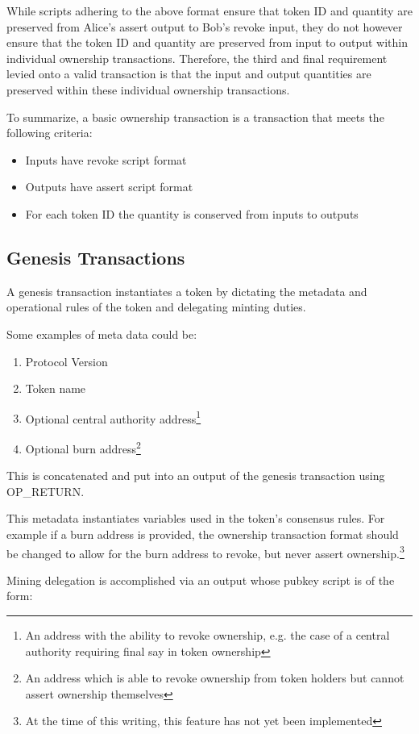 \documentclass[9pt,oneside]{amsart}
\begin{document}
While scripts adhering to the above format ensure that token ID and quantity are preserved from Alice's assert output to Bob's revoke input, they do not however ensure that the token ID and quantity are preserved from input to output within individual ownership transactions. Therefore, the third and final requirement levied onto a valid transaction is that the input and output quantities are preserved within these individual ownership transactions.

To summarize, a basic ownership transaction is a transaction that meets the following criteria:
\begin{itemize}
    \item Inputs have revoke script format
    \item Outputs have assert script format
    \item For each token ID the quantity is conserved from inputs to outputs
\end{itemize}

\subsection{Genesis Transactions}\label{subsec:gentrans}
A genesis transaction instantiates a token by dictating the metadata and operational rules of the token and delegating minting duties.

Some examples of meta data could be:
\begin{enumerate}
	\item Protocol Version
    \item Token name
	\item Optional central authority address\footnote{An address with the ability to revoke ownership, e.g. the case of a central authority requiring final say in token ownership}
    \item Optional burn address\footnote{An address which is able to revoke ownership from token holders but cannot assert ownership themselves}
\end{enumerate}
This is concatenated and put into an output of the genesis transaction using OP\_RETURN.

This metadata instantiates variables used in the token's consensus rules. For example if a burn address is provided, the ownership transaction format should be changed to allow for the burn address to revoke, but never assert ownership.\footnote{At the time of this writing, this feature has not yet been implemented}

Mining delegation is accomplished via an output whose pubkey script is of the form:
\end{document}
